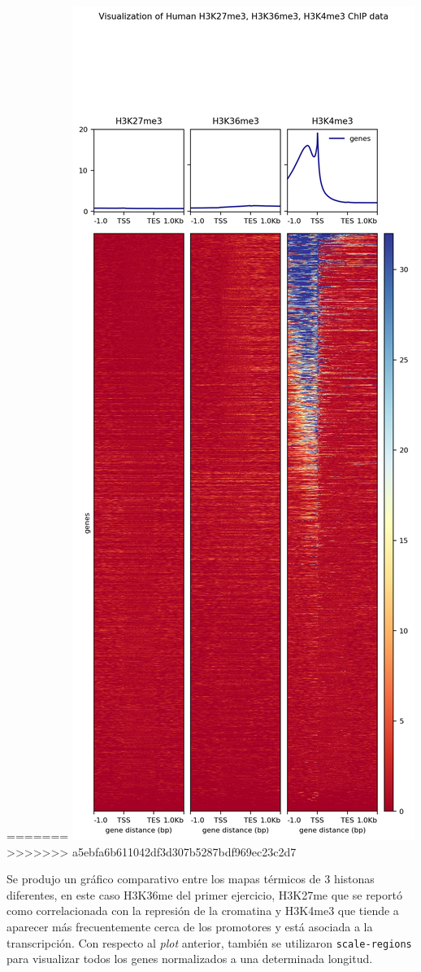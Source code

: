 \documentclass[
]{article}
\newcommand{\passthrough}[1]{#1}
\begin{document}
=======
\includegraphics{./T04_images/HistonesHeatmap.png}
>>>>>>> a5ebfa6b611042df3d307b5287bdf969ec23c2d7

Se produjo un gráfico comparativo entre los mapas térmicos de 3 histonas
diferentes, en este caso H3K36me del primer ejercicio, H3K27me que se
reportó como correlacionada con la represión de la cromatina y H3K4me3
que tiende a aparecer más frecuentemente cerca de los promotores y está
asociada a la transcripción. Con respecto al \emph{plot} anterior,
también se utilizaron \passthrough{\lstinline!scale-regions!} para
visualizar todos los genes normalizados a una determinada longitud.
\end{document}

